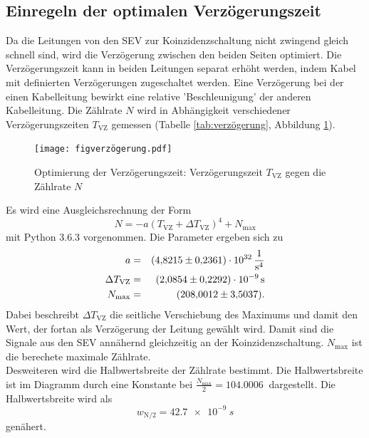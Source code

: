 \subsection{Einregeln der optimalen Verzögerungszeit}
Da die Leitungen von den SEV zur Koinzidenzschaltung nicht zwingend gleich schnell sind, wird die Verzögerung zwischen den beiden Seiten optimiert.
Die Verzögerungszeit kann in beiden Leitungen separat erhöht werden, indem Kabel mit definierten Verzögerungen zugeschaltet werden.
Eine Verzögerung bei der einen Kabelleitung bewirkt eine relative 'Beschleunigung' der anderen Kabelleitung.
Die Zählrate $N$ wird in Abhängigkeit verschiedener Verzögerungszeiten $T_{\text{VZ}}$ gemessen (Tabelle \ref{tab:verzögerung}, Abbildung \ref{fig:verzögerung}).

\begin{figure}[h!]
  \centering
  \texttt{[image: figverzögerung.pdf]}
  \caption{Optimierung der Verzögerungszeit: Verzögerungszeit $T_{\text{VZ}}$ gegen die Zählrate $N$}
  \label{fig:verzögerung}
\end{figure}
Es wird eine Ausgleichsrechnung der Form
\begin{equation*}
  N = -a \left( T_{\text{VZ}} + \Delta T_{\text{VZ}} \right)^4+N_{\text{max}}
\end{equation*}
mit Python 3.6.3 vorgenommen.
Die Parameter ergeben sich zu
\begin{align*}
  a                     &=& \SI{  4.8215 \pm 0.2361 e32}{\frac{1}{s^4}}\\
  \Delta T_{\text{VZ}}  &=& \SI{  2.0854 \pm 0.2292 e-9}{s}\\
  N_{\text{max}}        &=& \SI{208.0012 \pm 3.5037 }{}.\\
\end{align*}
Dabei beschreibt $\Delta T_{\text{VZ}}$ die seitliche Verschiebung des Maximums und damit den Wert, der fortan als Verzögerung der Leitung gewählt wird.
Damit sind die Signale aus den SEV annähernd gleichzeitig an der Koinzidenzschaltung. $N_{\text{max}}$ ist die berechete maximale Zählrate.\\
Desweiteren wird die Halbwertsbreite der Zählrate bestimmt.
Die Halbwertsbreite ist im Diagramm durch eine Konstante bei $\frac{N_{\text{max}}}{2}=\SI{104.0006}{}$ dargestellt.
Die Halbwertsbreite wird als
\begin{equation*}
  w_{\text{N/2}}= \SI{42.7e-9}{s}
\end{equation*}
genähert.
\FloatBarrier
